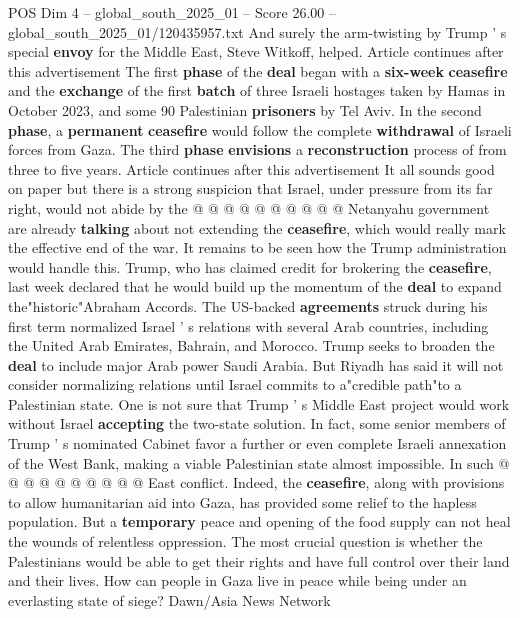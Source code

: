 \begin{textsample}{POS Dim 4 – global\_south\_2025\_01 – Score 26.00 – global\_south\_2025\_01/120435957.txt}
And surely the arm-twisting by Trump ' s special \textbf{envoy} for the Middle East, Steve Witkoff, helped.
Article continues after this advertisement The first \textbf{phase} of the \textbf{deal} began with a \textbf{six-week} \textbf{ceasefire} and the \textbf{exchange} of the first \textbf{batch} of three Israeli hostages taken by Hamas in October 2023, and some 90 Palestinian \textbf{prisoners} by Tel Aviv.
In the second \textbf{phase}, a \textbf{permanent} \textbf{ceasefire} would follow the complete \textbf{withdrawal} of Israeli forces from Gaza.
The third \textbf{phase} \textbf{envisions} a \textbf{reconstruction} process of from three to five years.
Article continues after this advertisement It all sounds good on paper but there is a strong suspicion that Israel, under pressure from its far right, would not abide by the @ @ @ @ @ @ @ @ @ @ Netanyahu government are already \textbf{talking} about not extending the \textbf{ceasefire}, which would really mark the effective end of the war.
It remains to be seen how the Trump administration would handle this.
Trump, who has claimed credit for brokering the \textbf{ceasefire}, last week declared that he would build up the momentum of the \textbf{deal} to expand the"historic"Abraham Accords.
The US-backed \textbf{agreements} struck during his first term normalized Israel ' s relations with several Arab countries, including the United Arab Emirates, Bahrain, and Morocco.
Trump seeks to broaden the \textbf{deal} to include major Arab power Saudi Arabia.
But Riyadh has said it will not consider normalizing relations until Israel commits to a"credible path"to a Palestinian state.
One is not sure that Trump ' s Middle East project would work without Israel \textbf{accepting} the two-state solution.
In fact, some senior members of Trump ' s nominated Cabinet favor a further or even complete Israeli annexation of the West Bank, making a viable Palestinian state almost impossible.
In such @ @ @ @ @ @ @ @ @ @ East conflict.
Indeed, the \textbf{ceasefire}, along with provisions to allow humanitarian aid into Gaza, has provided some relief to the hapless population.
But a \textbf{temporary} peace and opening of the food supply can not heal the wounds of relentless oppression.
The most crucial question is whether the Palestinians would be able to get their rights and have full control over their land and their lives.
How can people in Gaza live in peace while being under an everlasting state of siege?
Dawn/Asia News Network

\end{textsample}
